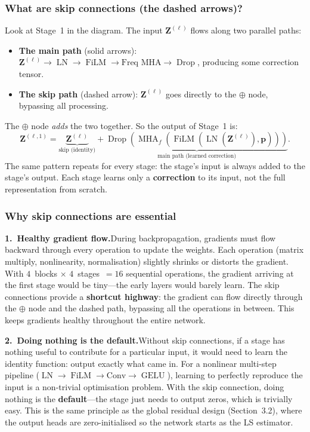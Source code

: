 \documentclass[11pt,a4paper]{article}
\newcommand{\bZ}{\mathbf{Z}}
\newcommand{\bp}{\mathbf{p}}
\DeclareMathOperator{\GELU}{GELU}
\DeclareMathOperator{\LN}{LN}
\DeclareMathOperator{\FiLM}{FiLM}
\DeclareMathOperator{\MHA}{MHA}
\DeclareMathOperator{\Drop}{Drop}
\begin{document}
	\subsubsection*{What are skip connections (the dashed arrows)?}
	
	Look at Stage~1 in the diagram.  The input $\bZ^{(\ell)}$ flows along two parallel paths:
	\begin{itemize}[nosep]
		\item \textbf{The main path} (solid arrows): $\bZ^{(\ell)} \to \LN \to \FiLM \to \text{Freq MHA} \to \Drop$, producing some correction tensor.
		\item \textbf{The skip path} (dashed arrow): $\bZ^{(\ell)}$ goes directly to the $\oplus$ node, bypassing all processing.
	\end{itemize}
	The $\oplus$ node \emph{adds} the two together.  So the output of Stage~1 is:
	\begin{equation}
		\bZ^{(\ell,1)} = \underbrace{\bZ^{(\ell)}}_{\text{skip (identity)}} + \underbrace{\Drop\!\left(\MHA_f\!\left(\FiLM(\LN(\bZ^{(\ell)}), \bp)\right)\right)}_{\text{main path (learned correction)}}.
		\label{eq:skip1}
	\end{equation}
	The same pattern repeats for every stage: the stage's input is always added to the stage's output.  Each stage learns only a \textbf{correction} to its input, not the full representation from scratch.
	
	\subsubsection*{Why skip connections are essential}
	
	\textbf{1.\ Healthy gradient flow.}\quad During backpropagation, gradients must flow backward through every operation to update the weights.  Each operation (matrix multiply, nonlinearity, normalisation) slightly shrinks or distorts the gradient.  With $4$~blocks $\times$ $4$~stages~$= 16$ sequential operations, the gradient arriving at the first stage would be tiny---the early layers would barely learn.  The skip connections provide a \textbf{shortcut highway}: the gradient can flow directly through the $\oplus$ node and the dashed path, bypassing all the operations in between.  This keeps gradients healthy throughout the entire network.
	
	\textbf{2.\ Doing nothing is the default.}\quad Without skip connections, if a stage has nothing useful to contribute for a particular input, it would need to learn the identity function: output exactly what came in.  For a nonlinear multi-step pipeline ($\LN \to \FiLM \to \text{Conv} \to \GELU$), learning to perfectly reproduce the input is a non-trivial optimisation problem.  With the skip connection, doing nothing is the \textbf{default}---the stage just needs to output zeros, which is trivially easy.  This is the same principle as the global residual design (Section~3.2), where the output heads are zero-initialised so the network starts as the LS estimator.
	
\end{document}
